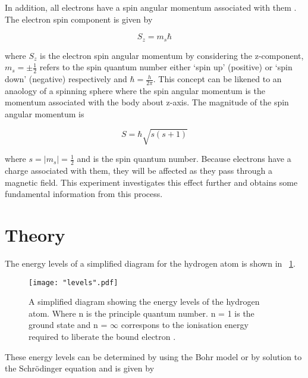 \documentclass{article}
\newcommand{\figref}[2][\figurename~]{#1\ref{#2}}
\begin{document}
\vspace{2mm}
\noindent
In addition, all electrons have a spin angular momentum associated with them \cite{Paper02}. The electron spin component is given by

\begin{equation}
\label{eq:spin}
S_z = m_s\hbar
\end{equation}

\vspace{2mm}
\noindent
where $S_z$ is the electron spin angular momentum by considering the z-component, $m_s = \pm\frac{1}{2}$ refers to the spin quantum number either `spin up' (positive) or `spin down' (negative) respectively and $\hbar = \frac{h}{2\pi}$. This concept can be likened to an anaology of a spinning sphere \cite{Book01} where the spin angular momentum is the momentum associated with the body about z-axis. The magnitude of the spin angular momentum is

\begin{equation}
\label{eq:spin-magnitude}
S = \hbar\sqrt{s(s+1)}
\end{equation}

\vspace{2mm}
\noindent
where $s = \mid{m_s}\mid = \frac{1}{2}$ and is the spin quantum number. Because electrons have a charge associated with them, they will be affected as they pass through a magnetic field. %
 This experiment investigates this effect further and obtains some fundamental information from this process.

\section{Theory}
\label{sec:theory}

The energy levels of a simplified diagram for the hydrogen atom is shown in \figref{fig:levels}.

\begin{figure}[h]
\centering
\texttt{[image: "levels".pdf]}
\caption{A simplified diagram showing the energy levels of the hydrogen atom. Where n is the principle quantum number. n = 1 is the ground state and n = $\infty$ correspons to the ionisation energy required to liberate the bound electron \cite{Paper01}.}
\label{fig:levels}
\end{figure}

\vspace{2mm}
\noindent
These energy levels can be determined by using the Bohr model or by solution to the Schr\"{o}dinger equation \cite{Paper01} and is given by
\end{document}
